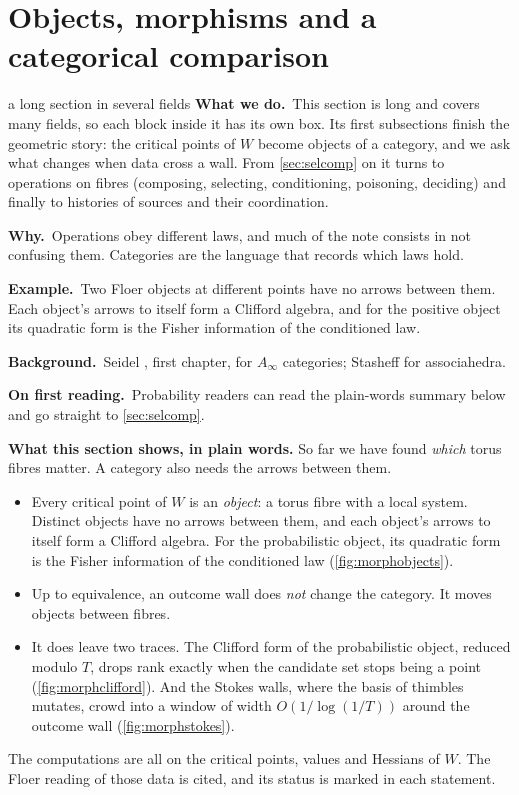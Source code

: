 \documentclass[11pt]{article}
\theoremstyle{definition}\newtheorem{definition}[theorem]{Definition}\newtheorem{remark}[theorem]{Remark}\newtheorem{example}[theorem]{Example}\newtheorem{problem}[theorem]{Open problem}\crefname{problem}{Problem}{Problems}
\newcommand{\rbwhat}{\textcolor{rbWhat}{\textbf{What we do.}}~}\newcommand{\rbwhy}{\par\smallskip\textcolor{rbWhy}{\textbf{Why.}}~}
\newcommand{\rbex}{\par\smallskip\textcolor{rbEx}{\textbf{Example.}}~}\newcommand{\rbbg}{\par\smallskip\textcolor{rbBg}{\textbf{Background.}}~}
\newcommand{\rbfirst}{\par\smallskip\textcolor{rbFirst}{\textbf{On first reading.}}~}
\begin{document}
\section{Objects, morphisms and a categorical comparison}\label{sec:morph}
\begin{readerbox}{a long section in several fields}
\rbwhat This section is long and covers many fields, so each block inside it has its own box. Its first subsections finish the geometric story: the critical points of $W$ become objects of a category, and we ask what changes when data cross a wall. From \cref{sec:selcomp} on it turns to operations on fibres (composing, selecting, conditioning, poisoning, deciding) and finally to histories of sources and their coordination.
\rbwhy Operations obey different laws, and much of the note consists in not confusing them. Categories are the language that records which laws hold.
\rbex Two Floer objects at different points have no arrows between them. Each object's arrows to itself form a Clifford algebra, and for the positive object its quadratic form is the Fisher information of the conditioned law.
\rbbg Seidel \cite{Seidel2008}, first chapter, for $A_\infty$ categories; Stasheff \cite{Stasheff1963} for associahedra.
\rbfirst Probability readers can read the plain-words summary below and go straight to \cref{sec:selcomp}.
\end{readerbox}
\begin{center}\colorbox{stAdapted!60}{\begin{minipage}{0.94\linewidth}\small
\textbf{What this section shows, in plain words.} So far we have found \emph{which} torus fibres matter. A category also needs the arrows between them.
\begin{itemize}[leftmargin=1.4em,itemsep=1pt]
\item Every critical point of $W$ is an \emph{object}: a torus fibre with a local system. Distinct objects have no arrows between them, and each object's arrows to itself
  form a Clifford algebra. For the probabilistic object, its quadratic form is the Fisher information of the conditioned law (\cref{fig:morphobjects}).
\item Up to equivalence, an outcome wall does \emph{not} change the category. It moves objects between fibres.
\item It does leave two traces. The Clifford form of the probabilistic object, reduced modulo $T$, drops rank exactly when the candidate set stops being a point (\cref{fig:morphclifford}).
  And the Stokes walls, where the basis of thimbles mutates, crowd into a window of width $O(1/\log(1/T))$ around the outcome wall (\cref{fig:morphstokes}).
\end{itemize}
The computations are all on the critical points, values and Hessians of $W$. The Floer reading of those data is cited, and its status is marked in each statement.
\end{minipage}}\end{center}
\end{document}
